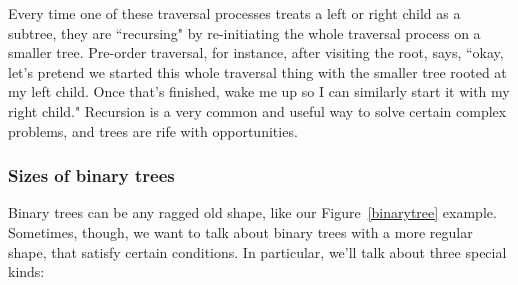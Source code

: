 Every time one of these traversal processes treats a left or right child as
a subtree, they are ``recursing" by re-initiating the whole traversal
process on a smaller tree. Pre-order traversal, for instance, after
visiting the root, says, ``okay, let's pretend we started this whole
traversal thing with the smaller tree rooted at my left child. Once that's
finished, wake me up so I can similarly start it with my right child."
Recursion is a very common and useful way to solve certain complex
problems, and trees are rife with opportunities.


\subsubsection{Sizes of binary trees}

Binary trees can be any ragged old shape, like our Figure~\ref{binarytree}
example. Sometimes, though, we want to talk about binary trees with a more
regular shape, that satisfy certain conditions. In particular, we'll talk
about three special kinds:

